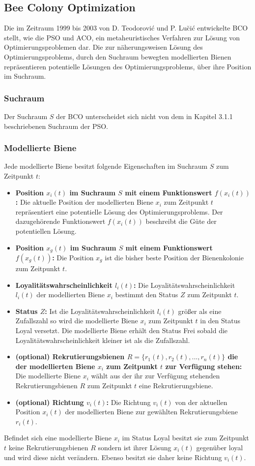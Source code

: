 \documentclass[a4paper, 11pt]{article}
\begin{document}
\subsection{Bee Colony Optimization}
Die im Zeitraum 1999 bis 2003 von D. Teodorovi\'{c} und P. Lu\u{c}i\'{c} entwickelte \ac{BCO} stellt, wie die \acs{PSO} und \acs{ACO}, ein metaheuristisches Verfahren zur Lösung von Optimierungsproblemen dar. Die zur näherungsweisen Lösung des Optimierungsproblems, durch den Suchraum bewegten modellierten Bienen repräsentieren potentielle Lösungen des Optimierungsproblems, über ihre Position im Suchraum. 
\subsubsection{Suchraum}
Der Suchraum $S$ der \acs{BCO} unterscheidet sich nicht von dem in Kapitel 3.1.1 beschriebenen Suchraum der \acs{PSO}. 
\subsubsection{Modellierte Biene}
Jede modellierte Biene besitzt folgende Eigenschaften im Suchraum $S$ zum Zeitpunkt $t$:
\begin{itemize}
	\item \textbf{Position $x_{i}(t)$ im Suchraum $S$ mit einem Funktionswert $f(x_{i}(t))$:} Die aktuelle Position der modellierten Biene $x_{i}$ zum Zeitpunkt $t$ repräsentiert eine potentielle Lösung des Optimierungsproblems. Der dazugehörende Funktionswert $f(x_{i}(t))$ beschreibt die Güte der potentiellen Lösung.
	\item \textbf{Position $x_{g}(t)$ im Suchraum $S$ mit einem Funktionswert $f(x_{g}(t))$:} Die Position $x_{g}$ ist die bisher beste Position der Bienenkolonie zum Zeitpunkt $t$.
	\item \textbf{Loyalitätswahrscheinlichkeit $l_{i}(t)$:} Die Loyalitätswahrscheinlichkeit $l_{i}(t)$ der modellierten Biene $x_{i}$ bestimmt den Status $Z$ zum Zeitpunkt $t$.
	\item \textbf{Status $Z$:} Ist die Loyalitätswahrscheinlichkeit $l_{i}(t)$ größer als eine Zufallszahl so wird die modellierte Biene $x_{i}$ zum Zeitpunkt $t$ in den Status Loyal versetzt. Die modellierte Biene erhält den Status Frei sobald die Loyalitätswahrscheinlichkeit kleiner ist als die Zufallszahl.
	\item \textbf{(optional) Rekrutierungsbienen  $R=\{r_{1}(t),r_{2}(t),...,r_{n}(t)\}$ die der modellierten Biene $x_{i}$ zum Zeitpunkt $t$ zur Verfügung stehen:} Die modellierte Biene $x_{i}$ wählt aus der ihr zur Verfügung stehenden Rekrutierungsbienen $R$ zum Zeitpunkt $t$ eine Rekrutierungsbiene. 
	\item \textbf{(optional) Richtung $v_{i}(t)$:} Die Richtung $v_{i}(t)$ von der aktuellen Position $x_{i}(t)$ der modellierten Biene zur gewählten Rekrutierungsbiene $r_{i}(t)$.
\end{itemize}
Befindet sich eine modellierte Biene $x_{i}$ im Status Loyal besitzt sie zum Zeitpunkt $t$ keine Rekrutierungsbienen $R$ sondern ist ihrer Lösung $x_{i}(t)$ gegenüber loyal und wird diese nicht verändern. Ebenso besitzt sie daher keine Richtung $v_{i}(t)$.
\newpage
\end{document}
